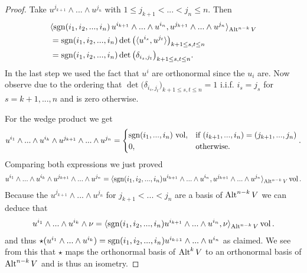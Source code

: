 \documentclass[../master_thesis.tex]{subfiles}
\begin{document}
\begin{proof}
    Take $u^{j_{k+1}} \wedge ... \wedge u^{j_n}$ with 
    $1 \leq j_{k+1} < ... < j_n \leq n$. Then 
    \begin{align*}
        &\langle \operatorname{sgn}(i_1,i_2,...,i_n) \, u^{i_{k+1}} \wedge ... \wedge u^{i_{n}},
            u^{j_{k+1}} \wedge ... \wedge u^{j_{n}} \rangle_{{\text{Alt}^{n-k}\,V}}
        \\ &= \operatorname{sgn}(i_1,i_2,...,i_n) \det \big( \langle u^{i_s}, u^{j_t} \rangle \big)_{k+1 \leq s,t \leq n}
        \\ &= \operatorname{sgn}(i_1,i_2,...,i_n) \det \big( \delta_{i_s,j_t} \big)_{k+1 \leq s,t \leq n}.
    \end{align*}
    In the last step we used the fact that $u^i$ are orthonormal since the $u_i$ 
    are. Now observe due to the ordering that 
    $\det \big( \delta_{i_s,j_t} \big)_{k+1 \leq s,t \leq n} = 1$ i.i.f.
    $i_s = j_s$ for $s = k+1,...,n$ and is zero otherwise.

    For the wedge product we get
    \begin{align*}
        u^{i_1} \wedge ... \wedge u^{i_{k}} \wedge u^{j_{k+1}} \wedge ... 
            \wedge u^{j_n}
        =   \begin{cases}
                \operatorname{sgn}(i_1, ..., i_n)\, \operatorname{vol}, & \text{if $(i_{k+1},...,i_n) = (j_{k+1},...,j_n)$} \\
                0,  & \text{otherwise.}
            \end{cases}.
    \end{align*}
    Comparing both expressions we just proved
    \begin{align*}
        u^{i_1} \wedge ... \wedge u^{i_{k}} \wedge u^{j_{k+1}} \wedge ... \wedge u^{j_n}
        = \langle \operatorname{sgn}(i_1,i_2,...,i_n) u^{i_{k+1}} \wedge ... \wedge u^{i_{n}},
            u^{j_{k+1}} \wedge ... \wedge u^{j_{n}} \rangle_{{\text{Alt}^{n-k}\,V}} \operatorname{vol}.
    \end{align*}
    Because the $u^{j_{k+1}} \wedge ... \wedge u^{j_n}$ for $j_{k+1} < ... < j_n$ are a 
    basis of ${\text{Alt}^{n-k}\,V}$ we can deduce that 
    \begin{align*}
        u^{i_1} \wedge ... \wedge u^{i_{k}} \wedge \nu = \langle \operatorname{sgn}(i_1,i_2,...,i_n) u^{i_{k+1}} \wedge 
        ... \wedge u^{i_{n}}, \nu \rangle_{{\text{Alt}^{n-k}\,V}} \operatorname{vol}.
    \end{align*}
    and thus  
    $\star (u^{i_1} \wedge ... \wedge u^{i_{k}}) = 
    \operatorname{sgn}(i_1,i_2,...,i_n) u^{i_{k+1}} \wedge ... \wedge u^{i_{n}}$ as claimed.
    We see from this that $\star$ maps the orthonormal basis of ${\text{Alt}^{k}\,V}$ 
    to an orthonormal
    basis of ${\text{Alt}^{n-k}\,V}$ and is thus an isometry.


\end{proof}
\end{document}
